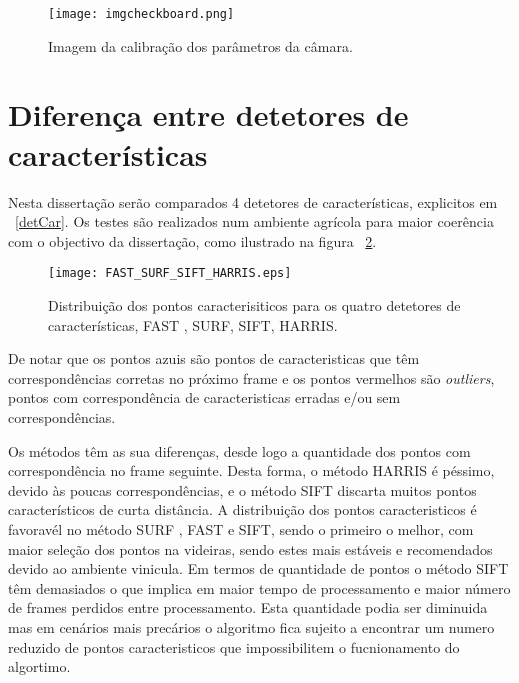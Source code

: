 \begin{figure}[h!]  %
	\centering
	\texttt{[image: imgcheckboard.png]} 
	\caption{Imagem da calibração dos parâmetros da câmara.}
	\label{fig:imgcheckboard}  %
\end{figure}


\section{Diferença entre detetores de características}

Nesta dissertação serão comparados 4 detetores de características, explicitos em  ~\ref{detCar}. Os testes são realizados num ambiente agrícola para maior coerência com o objectivo da dissertação, como ilustrado na figura ~\ref{fig:4metodos}.


\begin{figure}[h!]  %
	\begin{center}
	\texttt{[image: FAST\_SURF\_SIFT\_HARRIS.eps]} 
	\caption{Distribuição dos pontos caracterisiticos para os quatro detetores de características, FAST , SURF, SIFT, HARRIS.}
	\label{fig:4metodos}  %
	\end{center}
\end{figure}


De notar que os pontos azuis são pontos de caracteristicas que têm correspondências corretas no próximo frame e os pontos vermelhos são \textit{outliers}, pontos com correspondência de caracteristicas erradas e/ou sem correspondências.

Os métodos têm as sua diferenças, desde logo a quantidade dos pontos com correspondência no frame seguinte. Desta forma, o método HARRIS é péssimo, devido às poucas correspondências, e o método SIFT discarta muitos pontos característicos de curta distância. A distribuição dos pontos caracteristicos é favoravél no método SURF , FAST e SIFT, sendo o primeiro o melhor, com maior seleção dos pontos na videiras, sendo estes mais estáveis e recomendados devido ao ambiente vinicula. Em termos de quantidade de pontos o método SIFT têm demasiados o que implica em maior tempo de processamento e maior número de frames perdidos entre processamento. Esta quantidade podia ser diminuida mas em cenários 
mais precários o algoritmo fica sujeito a encontrar um numero reduzido de pontos caracteristicos que impossibilitem o fucnionamento do algortimo. 

